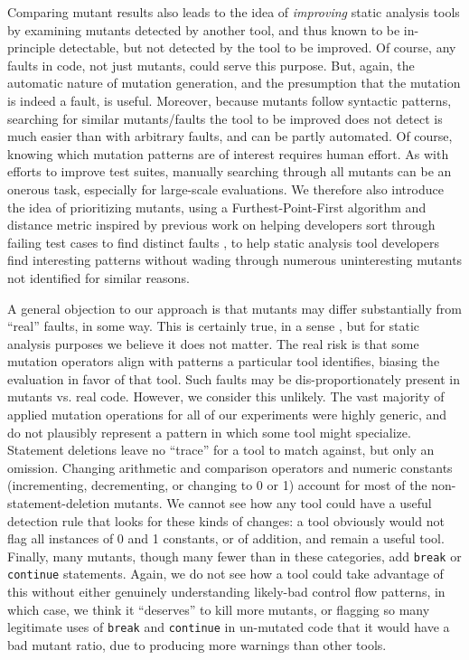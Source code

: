 Comparing mutant results also leads to the idea of \emph{improving} static analysis tools by examining mutants detected by another tool, and thus known to be in-principle detectable, but not detected by the tool to be improved.  Of course, any faults in code, not just mutants, could serve this purpose.  But, again, the automatic nature of mutation generation, and the presumption that the mutation is indeed a fault, is useful.  Moreover, because mutants follow syntactic patterns, searching for similar mutants/faults the tool to be improved does not detect is much easier than with arbitrary faults, and can be partly automated.  Of course, knowing which mutation patterns are of interest requires human effort.  As with efforts to improve test suites, manually searching through all mutants can be an onerous task, especially for large-scale evaluations.  We therefore also introduce the idea of prioritizing mutants, using a Furthest-Point-First \cite{Gonzalez} algorithm and distance metric inspired by previous work on helping developers sort through failing test cases to find distinct faults \cite{PLDI13,distMut}, to help static analysis tool developers find interesting patterns without wading through numerous uninteresting mutants not identified for similar reasons.

A general objection to our approach is that mutants may differ substantially from ``real'' faults, in some way.  This is certainly true, in a sense \cite{GopinathMutants}, but for static analysis purposes we believe it does not matter.   The real risk is that some mutation operators align with patterns a particular tool identifies, biasing the evaluation in favor of that tool.  Such faults may be dis-proportionately present in mutants vs. real code.  However, we consider this unlikely.  The vast majority of applied mutation operations for all of our experiments were highly generic, and do not plausibly represent a pattern in which some tool might specialize.  Statement deletions leave no ``trace'' for a tool to match against, but only an omission.  Changing arithmetic and comparison operators and numeric constants (incrementing, decrementing, or changing to 0 or 1) account for most of the non-statement-deletion mutants.  We cannot see how any tool could have a useful detection rule that looks for these kinds of changes: a tool obviously would not flag all instances of 0 and 1 constants, or of addition, and remain a useful tool.  Finally, many mutants, though many fewer than in these categories, add {\tt break} or {\tt continue} statements.  Again, we do not see how a tool could take advantage of this without either genuinely understanding likely-bad control flow patterns, in which case, we think it ``deserves'' to kill more mutants, or flagging so many legitimate uses of {\tt break} and {\tt continue} in un-mutated code that it would have a bad mutant ratio, due to producing more warnings than other tools. 

